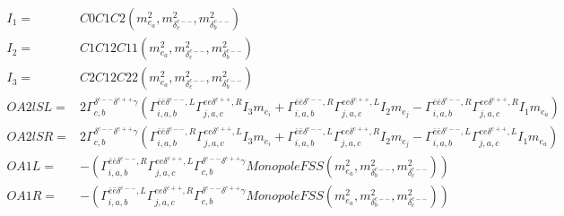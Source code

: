 \documentclass[A4,landscape]{article}
\begin{document}
\begin{align} 
I_1= & C0C1C2(m^2_{e_{{a}}}, m^2_{\delta^{c--}_{{c}}}, m^2_{\delta^{c--}_{{b}}}) \\ 
I_2= & C1C12C11(m^2_{e_{{a}}}, m^2_{\delta^{c--}_{{c}}}, m^2_{\delta^{c--}_{{b}}}) \\ 
I_3= & C2C12C22(m^2_{e_{{a}}}, m^2_{\delta^{c--}_{{c}}}, m^2_{\delta^{c--}_{{b}}}) \\ 
  OA2lSL= & 2  \Gamma^{\delta^{c--} \delta^{c++}\gamma }_{c, b} (\Gamma^{\bar{e}\bar{e}\delta^{c--} ,L}_{i, a, b} \Gamma^{e e \delta^{c++},R}_{j, a, c} I_3 m_{e_{{i}}} + \Gamma^{\bar{e}\bar{e}\delta^{c--} ,R}_{i, a, b} \Gamma^{e e \delta^{c++},L}_{j, a, c} I_2 m_{e_{{j}}} - \Gamma^{\bar{e}\bar{e}\delta^{c--} ,R}_{i, a, b} \Gamma^{e e \delta^{c++},R}_{j, a, c} I_1 m_{e_{{a}}}) \\ 
  OA2lSR= & 2  \Gamma^{\delta^{c--} \delta^{c++}\gamma }_{c, b} (\Gamma^{\bar{e}\bar{e}\delta^{c--} ,R}_{i, a, b} \Gamma^{e e \delta^{c++},L}_{j, a, c} I_3 m_{e_{{i}}} + \Gamma^{\bar{e}\bar{e}\delta^{c--} ,L}_{i, a, b} \Gamma^{e e \delta^{c++},R}_{j, a, c} I_2 m_{e_{{j}}} - \Gamma^{\bar{e}\bar{e}\delta^{c--} ,L}_{i, a, b} \Gamma^{e e \delta^{c++},L}_{j, a, c} I_1 m_{e_{{a}}}) \\ 
  OA1L= & -( \Gamma^{\bar{e}\bar{e}\delta^{c--} ,R}_{i, a, b} \Gamma^{e e \delta^{c++},L}_{j, a, c} \Gamma^{\delta^{c--} \delta^{c++}\gamma }_{c, b} MonopoleFSS(m^2_{e_{{a}}}, m^2_{\delta^{c--}_{{b}}}, m^2_{\delta^{c--}_{{c}}})) \\ 
  OA1R= & -( \Gamma^{\bar{e}\bar{e}\delta^{c--} ,L}_{i, a, b} \Gamma^{e e \delta^{c++},R}_{j, a, c} \Gamma^{\delta^{c--} \delta^{c++}\gamma }_{c, b} MonopoleFSS(m^2_{e_{{a}}}, m^2_{\delta^{c--}_{{b}}}, m^2_{\delta^{c--}_{{c}}})) \\ 
\end{align} 
\end{document}
